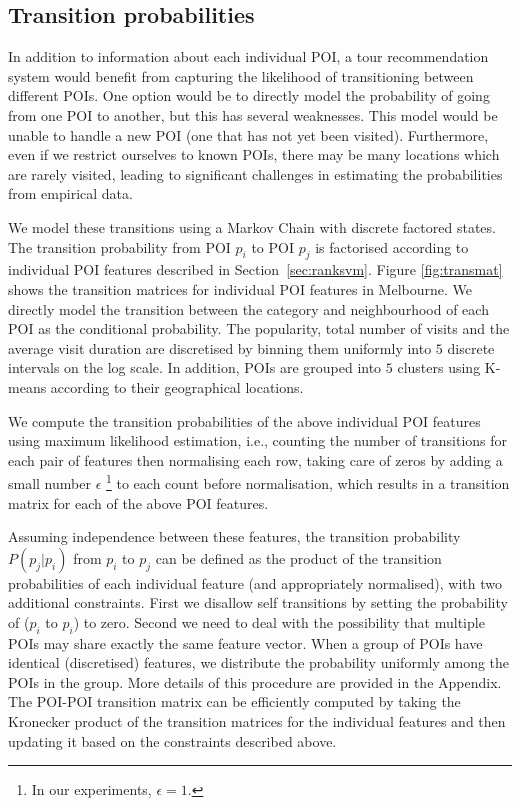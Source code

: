 \subsection{Transition probabilities}
\label{sec:transition}

In addition to information about each individual POI, a tour recommendation system would benefit
from capturing the likelihood of transitioning between different POIs. One option would be to
directly model the probability of going from one POI to another, but this has several weaknesses.
This model would be unable to handle a new POI (one that has not yet been visited).
Furthermore, even if we restrict ourselves to known POIs, there may be many locations which
are rarely visited, leading to significant challenges in estimating the probabilities from
empirical data.

We model these transitions using a Markov Chain with discrete factored states.
The transition probability from POI $p_i$ to POI $p_j$ is factorised according to
individual POI features described in Section~\ref{sec:ranksvm}.
Figure \ref{fig:transmat} shows the transition matrices for individual POI features
in Melbourne.
We directly model
the transition between the category and neighbourhood of each POI as the conditional probability.
The popularity, total number of visits and the average visit duration are discretised by binning
them uniformly into $5$ discrete intervals on the log scale.
In addition, POIs are grouped into $5$ clusters using K-means according to their geographical locations.

We compute the transition probabilities of the above individual POI features
using maximum likelihood estimation,
i.e., counting the number of transitions for each pair of features then normalising each row,
taking care of zeros by adding a small number $\epsilon$
\footnote{In our experiments, $\epsilon = 1$.}
to each count before normalisation,
which results in a transition matrix for each of the above POI features.

Assuming independence between these features,
the transition probability $P(p_j | p_i)$ from $p_i$ to $p_j$ can be defined as the product
of the transition probabilities of each individual feature (and appropriately normalised),
with two additional constraints.
First we disallow self transitions by setting the probability of ($p_i$ to $p_i$) to zero.
Second we need to deal with the possibility that multiple POIs may share exactly the same
feature vector.
When a group of POIs have identical (discretised) features, we distribute the probability
uniformly among the POIs in the group. More details of this procedure are provided in the Appendix.
The POI-POI transition matrix can be efficiently computed by taking the Kronecker product of
the transition matrices for the individual features and then updating it based on the constraints described above.

